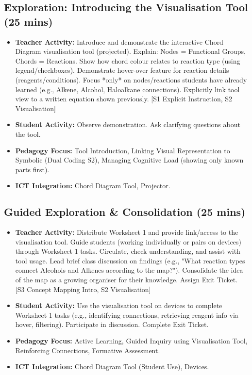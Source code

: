 \documentclass[11pt, a4paper]{article}
\begin{document}
\subsection*{Exploration: Introducing the Visualisation Tool (25 mins)}
\begin{itemize}
    \item \textbf{Teacher Activity:} Introduce and demonstrate the interactive Chord Diagram visualisation tool (projected). Explain: Nodes = Functional Groups, Chords = Reactions. Show how chord colour relates to reaction type (using legend/checkboxes). Demonstrate hover-over feature for reaction details (reagents/conditions). Focus *only* on nodes/reactions students have already learned (e.g., Alkene, Alcohol, Haloalkane connections). Explicitly link tool view to a written equation shown previously. [S1 Explicit Instruction, S2 Visualisation]
    \item \textbf{Student Activity:} Observe demonstration. Ask clarifying questions about the tool.
    \item \textbf{Pedagogy Focus:} Tool Introduction, Linking Visual Representation to Symbolic (Dual Coding S2), Managing Cognitive Load (showing only known parts first).
    \item \textbf{ICT Integration:} Chord Diagram Tool, Projector.
\end{itemize}

\subsection*{Guided Exploration \& Consolidation (25 mins)}
\begin{itemize}
    \item \textbf{Teacher Activity:} Distribute Worksheet 1 and provide link/access to the visualisation tool. Guide students (working individually or pairs on devices) through Worksheet 1 tasks. Circulate, check understanding, and assist with tool usage. Lead brief class discussion on findings (e.g., "What reaction types connect Alcohols and Alkenes according to the map?"). Consolidate the idea of the map as a growing organiser for their knowledge. Assign Exit Ticket. [S3 Concept Mapping Intro, S2 Visualisation]
    \item \textbf{Student Activity:} Use the visualisation tool on devices to complete Worksheet 1 tasks (e.g., identifying connections, retrieving reagent info via hover, filtering). Participate in discussion. Complete Exit Ticket.
    \item \textbf{Pedagogy Focus:} Active Learning, Guided Inquiry using Visualisation Tool, Reinforcing Connections, Formative Assessment.
    \item \textbf{ICT Integration:} Chord Diagram Tool (Student Use), Devices.
\end{itemize}
\end{document}
